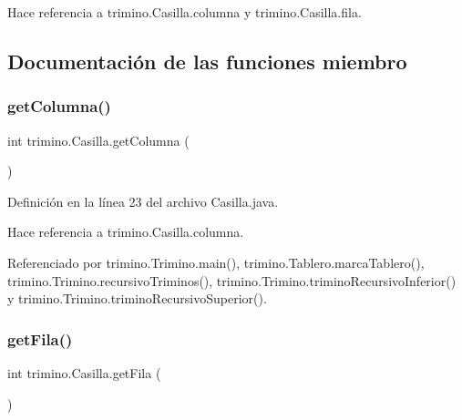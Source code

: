 Hace referencia a trimino.\+Casilla.\+columna y trimino.\+Casilla.\+fila.



\subsection{Documentación de las funciones miembro}
\mbox{\label{classtrimino_1_1Casilla_a1e2d0fe750f5f525c98d96b0fd415846}} 
\subsubsection{\texorpdfstring{getColumna()}{getColumna()}}
{\footnotesize\ttfamily int trimino.\+Casilla.\+get\+Columna (\begin{DoxyParamCaption}{ }\end{DoxyParamCaption})}



Definición en la línea 23 del archivo Casilla.\+java.


\begin{DoxyCode}{0}

\end{DoxyCode}


Hace referencia a trimino.\+Casilla.\+columna.



Referenciado por trimino.\+Trimino.\+main(), trimino.\+Tablero.\+marca\+Tablero(), trimino.\+Trimino.\+recursivo\+Triminos(), trimino.\+Trimino.\+trimino\+Recursivo\+Inferior() y trimino.\+Trimino.\+trimino\+Recursivo\+Superior().

\mbox{\label{classtrimino_1_1Casilla_a97678b5862f15d06cde4072444c4a286}} 
\subsubsection{\texorpdfstring{getFila()}{getFila()}}
{\footnotesize\ttfamily int trimino.\+Casilla.\+get\+Fila (\begin{DoxyParamCaption}{ }\end{DoxyParamCaption})}



